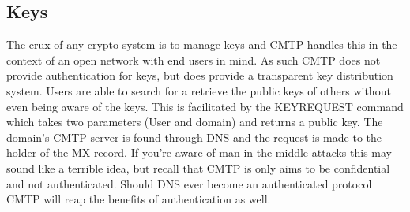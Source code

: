 \documentclass[a4paper,11pt]{article}
\begin{document}
\subsection{Keys}
The crux of any crypto system is to manage keys and CMTP handles this in the context of an open network with end users in mind. As such CMTP does not provide authentication for keys, but does provide a transparent key distribution system. Users are able to search for a retrieve the public keys of others without even being aware of the keys. This is facilitated by the KEYREQUEST command which takes two parameters (User and domain) and returns a public key. The domain's CMTP server is found through DNS and the request is made to the holder of the MX record. If you're aware of man in the middle attacks this may sound like a terrible idea, but recall that CMTP is only aims to be confidential and not authenticated. Should DNS ever become an authenticated protocol CMTP will reap the benefits of authentication as well.
\end{document}
